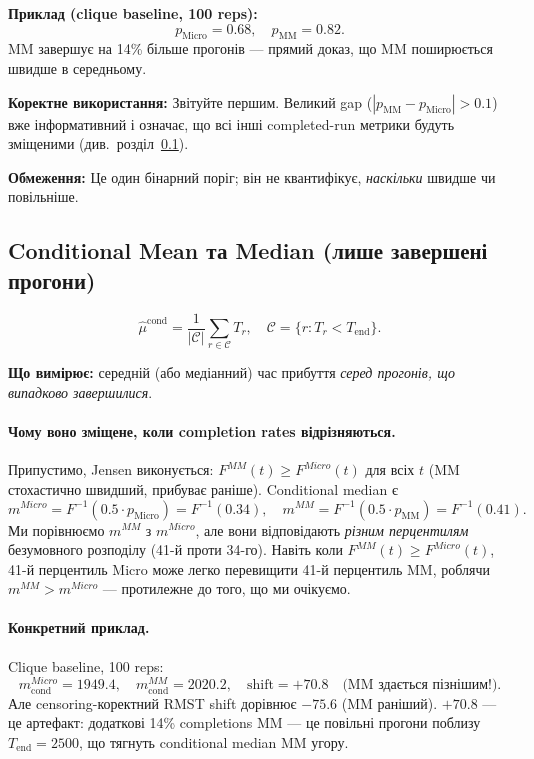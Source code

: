 \documentclass[11pt,a4paper]{article}
\begin{document}
\textbf{Приклад (clique baseline, 100 reps):}
\[
  p_{\mathrm{Micro}} = 0.68,\quad p_{\mathrm{MM}} = 0.82.
\]
MM завершує на 14\% більше прогонів --- прямий доказ, що MM поширюється швидше в середньому.

\textbf{Коректне використання:} Звітуйте першим.  Великий gap ($|p_{\mathrm{MM}} -
p_{\mathrm{Micro}}| > 0.1$) вже інформативний і означає, що всі інші
completed-run метрики будуть зміщеними (див.\ розділ~\ref{sec:bias}).

\textbf{Обмеження:} Це один бінарний поріг; він не квантифікує,
\emph{наскільки} швидше чи повільніше.

\subsection{Conditional Mean та Median (лише завершені прогони)}
\label{sec:bias}

\[
  \hat\mu^{\mathrm{cond}} = \frac{1}{|\mathcal{C}|}\sum_{r\in\mathcal{C}} T_r,
  \quad
  \mathcal{C} = \{r : T_r < T_{\mathrm{end}}\}.
\]

\textbf{Що вимірює:} середній (або медіанний) час прибуття
\emph{серед прогонів, що випадково завершилися}.

\paragraph{Чому воно зміщене, коли completion rates відрізняються.}
Припустимо, Jensen виконується: $F^{MM}(t) \geq F^{Micro}(t)$ для всіх $t$
(MM стохастично швидший, прибуває раніше).  Conditional median є
\[
  m^{Micro} = F^{-1}(0.5 \cdot p_{\mathrm{Micro}})
             = F^{-1}(0.34),
  \quad
  m^{MM}    = F^{-1}(0.5 \cdot p_{\mathrm{MM}})
             = F^{-1}(0.41).
\]
Ми порівнюємо $m^{MM}$ з $m^{Micro}$, але вони відповідають \emph{різним
перцентилям} безумовного розподілу (41-й проти 34-го).
Навіть коли $F^{MM}(t) \geq F^{Micro}(t)$, 41-й перцентиль Micro може
легко перевищити 41-й перцентиль MM, роблячи $m^{MM} > m^{Micro}$ ---
протилежне до того, що ми очікуємо.

\paragraph{Конкретний приклад.}
Clique baseline, 100 reps:
\[
  m_{\mathrm{cond}}^{Micro} = 1949.4,\quad
  m_{\mathrm{cond}}^{MM}    = 2020.2,\quad
  \text{shift} = +70.8 \quad \text{(MM здається пізнішим!)}.
\]
Але censoring-коректний RMST shift дорівнює $-75.6$ (MM раніший).
$+70.8$ --- це артефакт: додаткові 14\% completions MM --- це повільні прогони
поблизу $T_{\mathrm{end}} = 2500$, що тягнуть conditional median MM угору.
\end{document}
